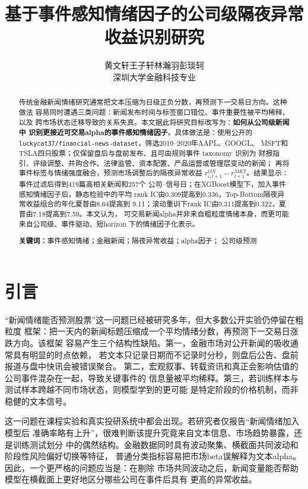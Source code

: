 \documentclass[UTF8,a4paper,10pt,twocolumn,fontset=none]{ctexart}
\title{\vspace{-1.1cm}\textbf{基于事件感知情绪因子的公司级隔夜异常收益识别研究}}
\author{黄文轩\quad 王子轩\quad 林瀚羽\quad 彭琰轲\\
\small 深圳大学金融科技专业}
\date{}
\begin{document}
\maketitle
\vspace{-1.6em}

\begin{abstract}
\small
传统金融新闻情绪研究通常把文本压缩为日级正负分数，再预测下一交易日方向。这种做法
容易同时遭遇三类问题：新闻发布时间与标签窗口错位、事件重要性被平均稀释、以及
跨市场状态迁移导致的关系失真。本文据此将研究目标改写为：\textbf{如何从公司级新闻中
识别更接近可交易alpha的事件感知情绪因子}。具体做法是：使用公开的
\texttt{luckycat37/financial-news-dataset}，筛选2019--2020年AAPL、GOOGL、
MSFT和TSLA四只股票；仅保留盘后与盘前发布、且可由规则事件 taxonomy 识别为
财报指引、评级调整、并购合作、法律监管、资本配置、产品运营或管理层变动的新闻；
再将事件标签与情绪强度融合，预测市场调整后的隔夜异常收益
$r^{ON}_{i,t+1}-r^{MKT}_{t+1}$。结果显示：事件过滤后得到419篇高相关新闻和257个
公司--信号日；在XGBoost模型下，加入事件感知情绪因子后，静态检验中的平均
rank IC由0.309提高到0.336，Top-Bottom隔夜异常收益组合的年化夏普由8.64提高到
9.11；滚动重训下rank IC由0.311提高到0.322，夏普由7.18提高到7.59。本文认为，
可交易新闻alpha并非来自粗粒度情绪本身，而更可能来自公司级、事件驱动、短horizon
下的情绪因子化表示。

\noindent\textbf{关键词：}事件感知情绪；金融新闻；隔夜异常收益；alpha因子；
公司级预测
\end{abstract}

\section{引言}

“新闻情绪能否预测股票”这一问题已经被研究多年，但大多数公开实验仍停留在粗粒度
框架：把一天内的新闻标题压缩成一个平均情绪分数，再预测下一交易日涨跌方向。该框架
容易产生三个结构性缺陷。第一，金融市场对公开新闻的吸收通常具有明显的时点依赖，
若文本只记录日期而不记录时分秒，则盘后公告、盘前报道与盘中快讯会被错误聚合。
第二，宏观叙事、转载资讯和真正会影响估值的公司事件混杂在一起，导致关键事件的
信息量被平均稀释。第三，若训练样本与测试样本跨越不同市场状态，则模型学到的更可能
是特定阶段的价格机制，而非稳健的文本信号。

这一问题在课程实验和真实投研系统中都会出现。若研究者仅报告“新闻情绪加入模型后
准确率略有上升”，很难判断该提升究竟来自文本信息、市场趋势暴露，还是训练测试划分
中的偶然结构。金融数据同时具有波动聚集、横截面共同波动和阶段性风险偏好切换等特征，
普通分类指标容易把市场beta误解释为文本alpha。因此，一个更严格的问题应当是：在剔除
市场共同波动之后，新闻变量能否帮助模型在横截面上更好地区分哪些公司在事件后具有
更高的异常收益。
\end{document}
